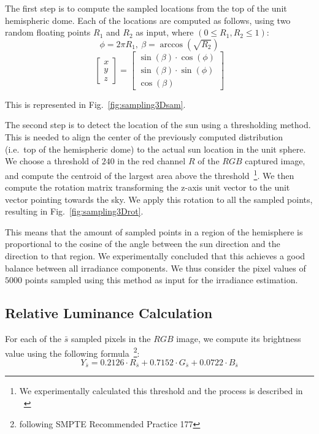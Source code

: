 The first step is to compute the sampled locations from the top of the unit hemispheric dome. Each of the locations are computed as follows, using two random floating points $R_1$ and $R_2$ as input, where $(0 \leq R_1, R_2 \leq 1)$: %
\[\phi = 2\pi R_1,\ \beta = \arccos(\sqrt{R_2})\]
\begin{equation}
     \begin{bmatrix}
         x \\
         y \\
         z
        \end{bmatrix}=\begin{bmatrix}
         \sin(\beta)\cdot \cos(\phi) \\
         \sin(\beta)\cdot \sin(\phi) \\
         \cos(\beta)
        \end{bmatrix}
  \end{equation}



This is represented in Fig.~\ref{fig:sampling3Dsam}. 

The second step is to detect the location of the sun using a thresholding method. This is needed to align the center of the previously computed distribution (i.e.\ top of the hemispheric dome) to the actual sun location in the unit sphere. We choose a threshold of $240$ in the red channel $R$ of the $RGB$ captured image, and compute the centroid of the largest area above the threshold~\footnote{We experimentally calculated this threshold and the process is described in ~\cite{IGARSS16_calib}}. We then compute the rotation matrix transforming the z-axis unit vector to the unit vector pointing towards the sky. We apply this rotation to all the sampled points, resulting in Fig.~\ref{fig:sampling3Drot}.

This means that the amount of sampled points in a region of the hemisphere is proportional to the cosine of the angle between the sun direction and the direction to that region. We experimentally concluded that this achieves a good balance between all irradiance components. We thus consider the pixel values of $5000$ points sampled using this method as input for the irradiance estimation.

\subsection{Relative Luminance Calculation}

For each of the $\bar{s}$ sampled pixels in the $RGB$ image, we compute its brightness value using the following formula~\footnote{following SMPTE Recommended Practice 177}:
\[Y_{\bar{s}} = 0.2126\cdot R_{\bar{s}}  + 0.7152\cdot G_{\bar{s}} + 0.0722\cdot B_{\bar{s}}\]

